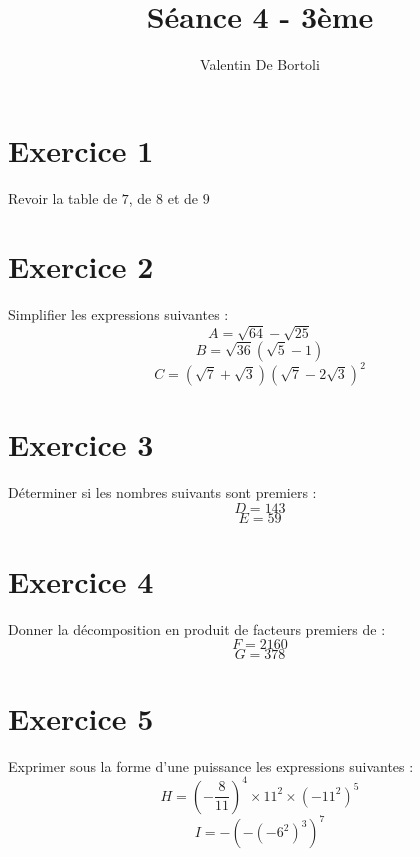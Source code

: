 \documentclass[10pt,a4paper]{article}
\title{Séance 4 - 3ème}
\author{Valentin De Bortoli}
\begin{document}
\maketitle
\section{Exercice 1}
Revoir la table de $7$, de $8$ et de $9$
\section{Exercice 2}
Simplifier les expressions suivantes :
\begin{equation}
A=\sqrt{64}-\sqrt{25}
\end{equation}
\begin{equation}
B=\sqrt{36}(\sqrt{5}-1)
\end{equation}
\begin{equation}
C=(\sqrt{7}+\sqrt{3})(\sqrt{7}-2\sqrt{3})^2
\end{equation}
\section{Exercice 3}
Déterminer si les nombres suivants sont premiers :
\begin{equation}
D=143
\end{equation}
\begin{equation}
E=59
\end{equation}
\section{Exercice 4}
Donner la décomposition en produit de facteurs premiers de :
\begin{equation}
F=2160
\end{equation}
\begin{equation}
G=378
\end{equation}
\section{Exercice 5}
Exprimer sous la forme d'une puissance les expressions suivantes :
\begin{equation}
H=\left(-\frac{8}{11}\right)^4\times 11^2 \times (-11^2)^5
\end{equation}
\begin{equation}
I=-(-(-6^2)^3)^7
\end{equation}
\end{document}
